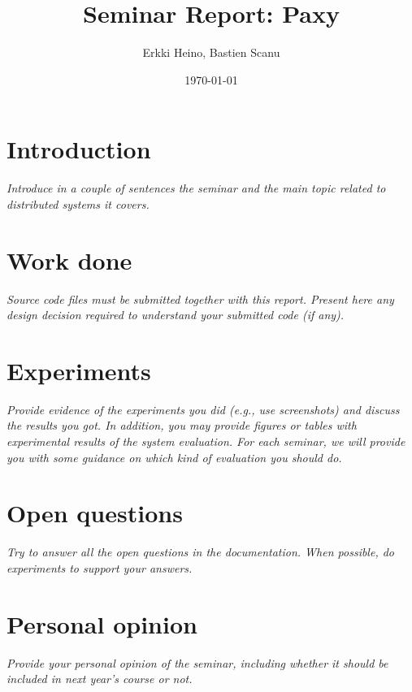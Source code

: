 \documentclass[a4paper, 11pt]{article}
\title{Seminar Report: Paxy}
\author{Erkki Heino, Bastien Scanu}
\date{\today{}}
\begin{document}
\maketitle

\section{Introduction}

\textit{Introduce in a couple of sentences the seminar and the main topic related to distributed systems it covers.}

\section{Work done}

\textit{Source code files must be submitted together with this report. Present here any design decision required to understand your submitted code (if any).}

\section{Experiments}

\textit{Provide evidence of the experiments you did (e.g., use screenshots) and discuss the results you got. In addition, you may provide figures or tables with experimental results of the system evaluation. For each seminar, we will provide you with some guidance on which kind of evaluation you should do.}

\section{Open questions}

\textit{Try to answer all the open questions in the documentation. When possible, do experiments to support your answers.}

\section{Personal opinion}

\textit{Provide your personal opinion of the seminar, including whether it should be included in next year's course or not.}
\end{document}
